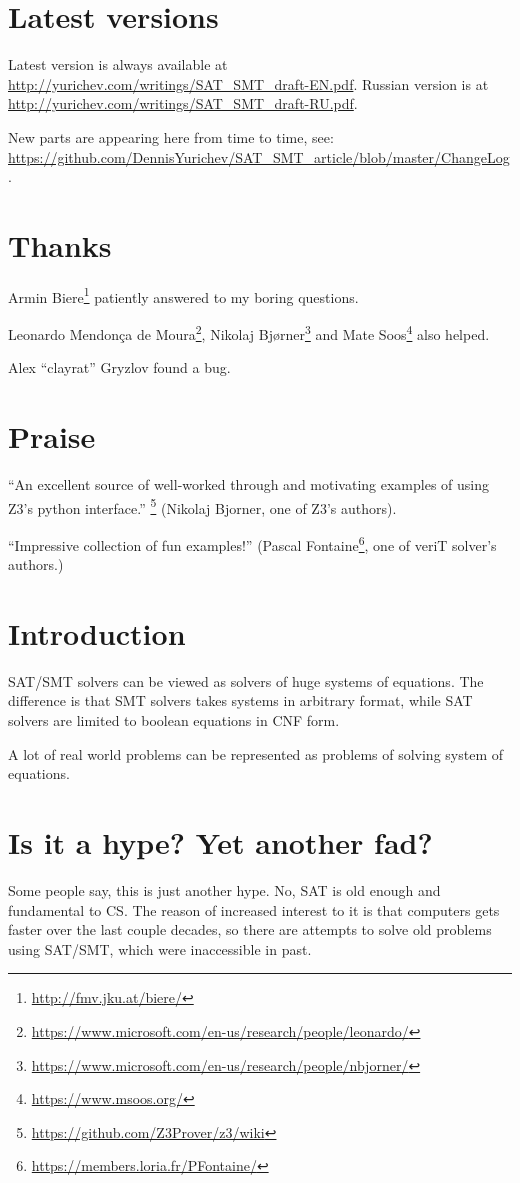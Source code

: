 \section{Latest versions}

Latest version is always available at \url{http://yurichev.com/writings/SAT_SMT_draft-EN.pdf}.
Russian version is at \url{http://yurichev.com/writings/SAT_SMT_draft-RU.pdf}.

New parts are appearing here from time to time, see: \url{https://github.com/DennisYurichev/SAT_SMT_article/blob/master/ChangeLog}.

\section{Thanks}

Armin Biere\footnote{\url{http://fmv.jku.at/biere/}} patiently answered to my boring questions.

Leonardo Mendonça de Moura\footnote{\url{https://www.microsoft.com/en-us/research/people/leonardo/}},
Nikolaj Bjørner\footnote{\url{https://www.microsoft.com/en-us/research/people/nbjorner/}}
and Mate Soos\footnote{\url{https://www.msoos.org/}} also helped.

Alex ``clayrat'' Gryzlov found a bug.

\section{Praise}

``An excellent source of well-worked through and motivating examples of using Z3's python interface.''
\footnote{\url{https://github.com/Z3Prover/z3/wiki}}
(Nikolaj Bjorner, one of Z3's authors).

``Impressive collection of fun examples!''
(Pascal Fontaine\footnote{\url{https://members.loria.fr/PFontaine/}}, one of veriT solver's authors.)

\section{Introduction}

\ac{SAT}/\ac{SMT} solvers can be viewed as solvers of huge systems of equations.
The difference is that \ac{SMT} solvers takes systems in arbitrary format,
while \ac{SAT} solvers are limited to boolean equations in \ac{CNF} form.

A lot of real world problems can be represented as problems of solving system of equations.

\section{Is it a hype? Yet another fad?}

Some people say, this is just another hype.
No, \ac{SAT} is old enough and fundamental to \ac{CS}.
The reason of increased interest to it is that computers gets faster over the last couple decades,
so there are attempts to solve old problems using \ac{SAT}/\ac{SMT}, which were inaccessible in past.

